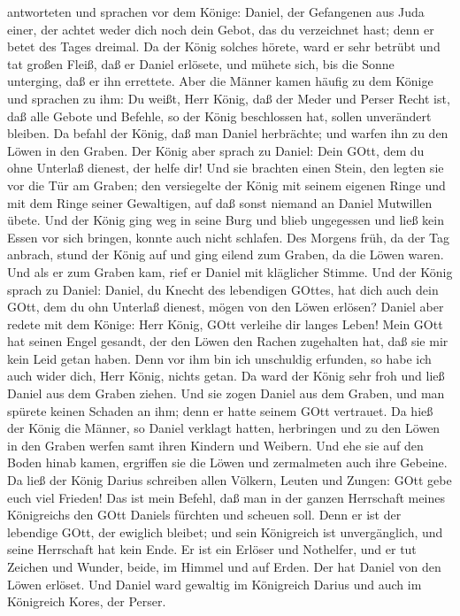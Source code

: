 antworteten und sprachen vor dem Könige: Daniel, der Gefangenen aus Juda
einer, der achtet weder dich noch dein Gebot, das du verzeichnet hast;
denn er betet des Tages dreimal.  Da der König solches
hörete, ward er sehr betrübt und tat großen Fleiß, daß er Daniel
erlösete, und mühete sich, bis die Sonne unterging, daß er ihn
errettete.  Aber die Männer kamen häufig zu dem Könige und
sprachen zu ihm: Du weißt, Herr König, daß der Meder und Perser Recht
ist, daß alle Gebote und Befehle, so der König beschlossen hat, sollen
unverändert bleiben.  Da befahl der König, daß man Daniel
herbrächte; und warfen ihn zu den Löwen in den Graben. Der König aber
sprach zu Daniel: Dein GOtt, dem du ohne Unterlaß dienest, der helfe
dir!  Und sie brachten einen Stein, den legten sie vor die
Tür am Graben; den versiegelte der König mit seinem eigenen Ringe und
mit dem Ringe seiner Gewaltigen, auf daß sonst niemand an Daniel
Mutwillen übete.  Und der König ging weg in seine Burg und
blieb ungegessen und ließ kein Essen vor sich bringen, konnte auch nicht
schlafen.  Des Morgens früh, da der Tag anbrach, stund der
König auf und ging eilend zum Graben, da die Löwen waren. 
Und als er zum Graben kam, rief er Daniel mit kläglicher Stimme. Und der
König sprach zu Daniel: Daniel, du Knecht des lebendigen GOttes, hat
dich auch dein GOtt, dem du ohn Unterlaß dienest, mögen von den Löwen
erlösen?  Daniel aber redete mit dem Könige: Herr König,
GOtt verleihe dir langes Leben!  Mein GOtt hat seinen Engel
gesandt, der den Löwen den Rachen zugehalten hat, daß sie mir kein Leid
getan haben. Denn vor ihm bin ich unschuldig erfunden, so habe ich auch
wider dich, Herr König, nichts getan.  Da ward der König
sehr froh und ließ Daniel aus dem Graben ziehen. Und sie zogen Daniel
aus dem Graben, und man spürete keinen Schaden an ihm; denn er hatte
seinem GOtt vertrauet.  Da hieß der König die Männer, so
Daniel verklagt hatten, herbringen und zu den Löwen in den Graben werfen
samt ihren Kindern und Weibern. Und ehe sie auf den Boden hinab kamen,
ergriffen sie die Löwen und zermalmeten auch ihre Gebeine. 
Da ließ der König Darius schreiben allen Völkern, Leuten und Zungen:
GOtt gebe euch viel Frieden!  Das ist mein Befehl, daß man
in der ganzen Herrschaft meines Königreichs den GOtt Daniels fürchten
und scheuen soll. Denn er ist der lebendige GOtt, der ewiglich bleibet;
und sein Königreich ist unvergänglich, und seine Herrschaft hat kein
Ende.  Er ist ein Erlöser und Nothelfer, und er tut Zeichen
und Wunder, beide, im Himmel und auf Erden. Der hat Daniel von den Löwen
erlöset.  Und Daniel ward gewaltig im Königreich Darius und
auch im Königreich Kores, der Perser.

